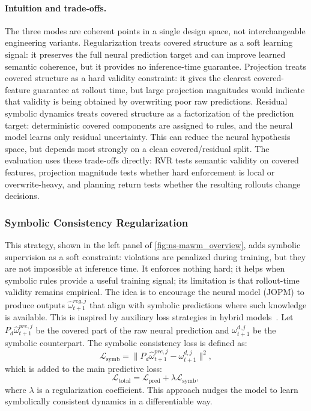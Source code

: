 \documentclass{article}
\theoremstyle{plain}
\theoremstyle{definition}
\theoremstyle{remark}
\begin{document}
\paragraph{Intuition and trade-offs.}
The three modes are coherent points in a single design space, not interchangeable engineering variants.
Regularization treats covered structure as a soft learning signal: it preserves the full neural prediction target and can improve learned semantic coherence, but it provides no inference-time guarantee.
Projection treats covered structure as a hard validity constraint: it gives the clearest covered-feature guarantee at rollout time, but large projection magnitudes would indicate that validity is being obtained by overwriting poor raw predictions.
Residual symbolic dynamics treats covered structure as a factorization of the prediction target: deterministic covered components are assigned to rules, and the neural model learns only residual uncertainty.
This can reduce the neural hypothesis space, but depends most strongly on a clean covered/residual split.
The evaluation uses these trade-offs directly: RVR tests semantic validity on covered features, projection magnitude tests whether hard enforcement is local or overwrite-heavy, and planning return tests whether the resulting rollouts change decisions.

\subsubsection{Symbolic Consistency Regularization}
\label{sec:symbolic_loss_regularization}

This strategy, shown in the left panel of \autoref{fig:ns-mawm_overview}, adds symbolic supervision as a soft constraint: violations are penalized during training, but they are not impossible at inference time. It enforces nothing hard; it helps when symbolic rules provide a useful training signal; its limitation is that rollout-time validity remains empirical. The idea is to encourage the neural model (JOPM) to produce outputs $\hat{\omega}^{reg,j}_{t+1}$ that align with symbolic predictions where such knowledge is available. This is inspired by auxiliary loss strategies in hybrid models~\cite{Xu2018semanticloss, garcez2023neurosymbolic}. Let $P_d\hat{\omega}^{pre,j}_{t+1}$ be the covered part of the raw neural prediction and $\omega^{d,j}_{t+1}$ be the symbolic counterpart.
%
The symbolic consistency loss is defined as:
\begin{equation}
  \mathcal{L}_{\text{symb}} = \| P_d\hat{\omega}^{pre,j}_{t+1} - \omega^{d,j}_{t+1} \|^2,
  \label{eq:symbolic_loss}
\end{equation}
which is added to the main predictive loss:
\begin{equation}
  \mathcal{L}_{\text{total}} = \mathcal{L}_{\text{pred}} + \lambda \mathcal{L}_{\text{symb}},
  \label{eq:total_loss}
\end{equation}
where $\lambda$ is a regularization coefficient. This approach nudges the model to learn symbolically consistent dynamics in a differentiable way.
\end{document}
